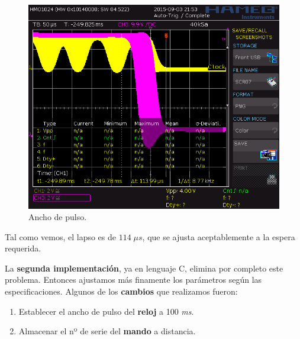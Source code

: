 \begin{figure}[H]
	\noindent \begin{centering}
		\includegraphics[width=\linewidth*2/3]{capitulo6/osc_pulso}
		\par\end{centering}
	\smallskip
	\caption{\label{fig:osc_pulso} Ancho de pulso.}
\end{figure} 

\smallskip

Tal como vemos, el lapso es de $114 \; \mu s$, que se ajusta aceptablemente a la espera requerida. 

La \textbf{segunda implementación}, ya en lenguaje C, elimina por completo este problema. Entonces ajustamos más finamente los parámetros según las especificaciones. Algunos de los \textbf{cambios} que realizamos fueron:

\begin{enumerate}
	\item Establecer el ancho de pulso del \textbf{reloj} a 100 \textit{ms}.
	\item Almacenar el nº de serie del \textbf{mando} a distancia.
\end{enumerate}




